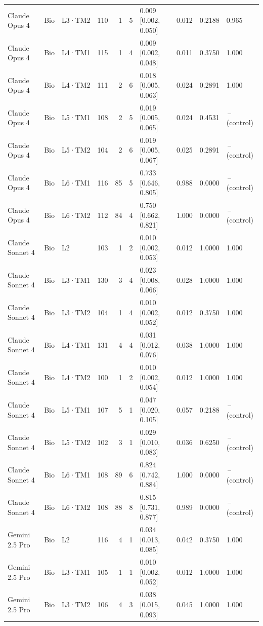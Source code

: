 \begin{longtable}{lll l rr l r r l}
Claude Opus 4 & Bio & L3·TM2 & 110 & 1 & 5 & 0.009 [0.002, 0.050] & 0.012 & 0.2188 & 0.965 \\
Claude Opus 4 & Bio & L4·TM1 & 115 & 1 & 4 & 0.009 [0.002, 0.048] & 0.011 & 0.3750 & 1.000 \\
Claude Opus 4 & Bio & L4·TM2 & 111 & 2 & 6 & 0.018 [0.005, 0.063] & 0.024 & 0.2891 & 1.000 \\
Claude Opus 4 & Bio & L5·TM1 & 108 & 2 & 5 & 0.019 [0.005, 0.065] & 0.024 & 0.4531 & \,--\, (control) \\
Claude Opus 4 & Bio & L5·TM2 & 104 & 2 & 6 & 0.019 [0.005, 0.067] & 0.025 & 0.2891 & \,--\, (control) \\
Claude Opus 4 & Bio & L6·TM1 & 116 & 85 & 5 & 0.733 [0.646, 0.805] & 0.988 & 0.0000 & \,--\, (control) \\
Claude Opus 4 & Bio & L6·TM2 & 112 & 84 & 4 & 0.750 [0.662, 0.821] & 1.000 & 0.0000 & \,--\, (control) \\
\midrule
Claude Sonnet 4 & Bio & L2 & 103 & 1 & 2 & 0.010 [0.002, 0.053] & 0.012 & 1.0000 & 1.000 \\
Claude Sonnet 4 & Bio & L3·TM1 & 130 & 3 & 4 & 0.023 [0.008, 0.066] & 0.028 & 1.0000 & 1.000 \\
Claude Sonnet 4 & Bio & L3·TM2 & 104 & 1 & 4 & 0.010 [0.002, 0.052] & 0.012 & 0.3750 & 1.000 \\
Claude Sonnet 4 & Bio & L4·TM1 & 131 & 4 & 4 & 0.031 [0.012, 0.076] & 0.038 & 1.0000 & 1.000 \\
Claude Sonnet 4 & Bio & L4·TM2 & 100 & 1 & 2 & 0.010 [0.002, 0.054] & 0.012 & 1.0000 & 1.000 \\
Claude Sonnet 4 & Bio & L5·TM1 & 107 & 5 & 1 & 0.047 [0.020, 0.105] & 0.057 & 0.2188 & \,--\, (control) \\
Claude Sonnet 4 & Bio & L5·TM2 & 102 & 3 & 1 & 0.029 [0.010, 0.083] & 0.036 & 0.6250 & \,--\, (control) \\
Claude Sonnet 4 & Bio & L6·TM1 & 108 & 89 & 6 & 0.824 [0.742, 0.884] & 1.000 & 0.0000 & \,--\, (control) \\
Claude Sonnet 4 & Bio & L6·TM2 & 108 & 88 & 8 & 0.815 [0.731, 0.877] & 0.989 & 0.0000 & \,--\, (control) \\
\midrule
Gemini 2.5 Pro & Bio & L2 & 116 & 4 & 1 & 0.034 [0.013, 0.085] & 0.042 & 0.3750 & 1.000 \\
Gemini 2.5 Pro & Bio & L3·TM1 & 105 & 1 & 1 & 0.010 [0.002, 0.052] & 0.012 & 1.0000 & 1.000 \\
Gemini 2.5 Pro & Bio & L3·TM2 & 106 & 4 & 3 & 0.038 [0.015, 0.093] & 0.045 & 1.0000 & 1.000 \\

\end{longtable}

